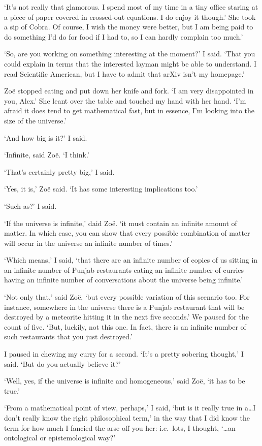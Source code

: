 `It's not really that glamorous. I spend most of my time
in a tiny office staring at a piece of paper covered in crossed-out
equations. I do enjoy it though.' She took a sip of Cobra. Of course, I
wish the money were better, but I am being paid to do something I'd
do for food if I had to, so I can hardly complain too much.'

`So, are you working on something interesting at the moment?' I
said. `That you could explain in terms that the interested layman
might be able to understand. I read {\twelvesl Scientific
American\/}, but I have to admit that arXiv isn't my homepage.'

Zoë stopped eating and put down her knife and fork. `I am very
disappointed in you, Alex.' She leant over the table and touched my
hand with her hand. `I'm afraid it does tend to get
mathematical fast, but in essence, I'm looking into the
size of the universe.'

`And how big is it?' I said.

`Infinite, said Zoë. `I think.'

`That's certainly pretty big,' I said.

`Yes, it is,' Zoë said. `It has some interesting
implications too.'

`Such as?' I said.

`If the universe is infinite,' daid Zoë. `it must contain
an infinite amount of matter. In which case, you can show that every
possible combination of matter will occur in the universe an
infinite number of times.'

`Which means,' I said, `that there are an infinite number of copies
of us sitting in an infinite number of Punjab restaurants eating an
infinite number of curries having an infinite number of
conversations about the universe being infinite.'

`Not only that,' said Zoë, `but every possible variation of
this scenario too. For instance, somewhere in the universe there is
a Punjab restaurant that will be destroyed by a meteorite hitting it
in the next five seconds.' We paused for the count of five. `But,
luckily, not this one. In fact, there is an
infinite number of such restaurants that you just destroyed.'

I paused in chewing my curry for a second. `It's a pretty sobering
thought,' I said. `But do you actually believe it?'

`Well, yes, if the universe is infinite and homogeneous,' said
Zoë, `it has to be true.'

`From a mathematical point of view, perhaps,' I said, `but is it
really true in a\dots I don't really know the right philosophical
term,' in the way that I did know the term for how much I fancied
the arse off you her: i.e.~lots, I thought, `{\dots}an ontological or
epistemological way?'

